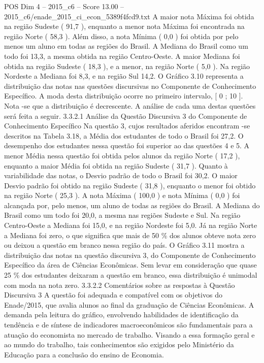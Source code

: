 \begin{textsample}{POS Dim 4 – 2015\_c6 – Score 13.00 – 2015\_c6/enade\_2015\_ci\_econ\_5389f4fcd9.txt}
A maior nota Máxima foi obtida na região Sudeste ( 91,7 ), enquanto a menor nota Máxima foi encontrada na região Norte ( 58,3 ).
Além disso, a nota Mínima ( 0,0 ) foi obtida por pelo menos um aluno em todas as regiões do Brasil.
A Mediana do Brasil como um todo foi 13,3, a mesma obtida na região Centro-Oeste.
A maior Mediana foi obtida na região Sudeste ( 18,3 ), e a menor, na região Norte ( 5,0 ).
Na região Nordeste a Mediana foi 8,3, e na região Sul 14,2.
O Gráfico 3.10 representa a distribuição das notas nas questões discursivas no Componente de Conhecimento Específico.
A moda desta distribuição ocorre no primeiro intervalo, [ 0 ; 10 ].
Nota -se que a distribuição é decrescente.
A análise de cada uma destas questões será feita a seguir. 3.3.2.1 Análise da Questão Discursiva 3 do Componente de Conhecimento Específico Na questão 3, cujos resultados aferidos encontram -se descritos na Tabela 3.18, a Média dos estudantes de todo o Brasil foi 27,2.
O desempenho dos estudantes nessa questão foi superior ao das questões 4 e 5.
A menor Média nessa questão foi obtida pelos alunos da região Norte ( 17,2 ), enquanto a maior Média foi obtida na região Sudeste ( 31,7 ).
Quanto à variabilidade das notas, o Desvio padrão de todo o Brasil foi 30,2.
O maior Desvio padrão foi obtido na região Sudeste ( 31,8 ), enquanto o menor foi obtido na região Norte ( 25,3 ).
A nota Máxima ( 100,0 ) e nota Mínima ( 0,0 ) foi alcançada por, pelo menos, um aluno de todas as regiões do Brasil.
A Mediana do Brasil como um todo foi 20,0, a mesma nas regiões Sudeste e Sul.
Na região Centro-Oeste a Mediana foi 15,0, e na região Nordeste foi 5,0.
Já na região Norte a Mediana foi zero, o que significa que mais de 50 \% dos alunos obteve nota zero ou deixou a questão em branco nessa região do país.
O Gráfico 3.11 mostra a distribuição das notas na questão discursiva 3, do Componente de Conhecimento Específico da área de Ciências Econômicas.
Sem levar em consideração que quase 25 \% dos estudantes deixaram a questão em branco, essa distribuição é unimodal com moda na nota zero. 3.3.2.2 Comentários sobre as respostas à Questão Discursiva 3 A questão foi adequada e compatível com os objetivos do Enade/2015, que avalia alunos ao final da graduação de Ciências Econômicas.
A demanda pela leitura do gráfico, envolvendo habilidades de identificação da tendência e de síntese de indicadores macroeconômicos são fundamentais para a atuação do economista no mercado de trabalho.
Visando a essa formação geral e ao mundo do trabalho, tais conhecimentos são exigidos pelo Ministério da Educação para a conclusão do ensino de Economia.

\end{textsample}
